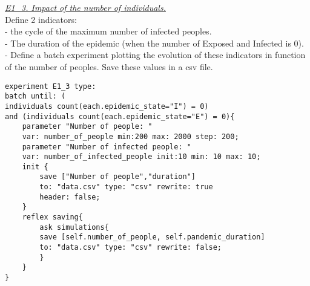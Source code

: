 \documentclass{article}
\begin{document}
\raggedright\underline{\textit{E1\_3. Impact of the number of individuals.}}
\\
Define 2 indicators:\\
- the cycle of the maximum number of infected peoples.\\
- The duration of the epidemic (when the number of Exposed and Infected is
0).\\
- Define a batch experiment plotting the evolution of these indicators in function
of the number of peoples. Save these values in a csv file.
\\[1\baselineskip]
\begin{tcolorbox}
\begin{lstlisting}
experiment E1_3 type: 
batch until: (
individuals count(each.epidemic_state="I") = 0) 
and (individuals count(each.epidemic_state="E") = 0){
	parameter "Number of people: " 
	var: number_of_people min:200 max: 2000 step: 200;
	parameter "Number of infected people: " 
	var: number_of_infected_people init:10 min: 10 max: 10;
	init {
		save ["Number of people","duration"] 
		to: "data.csv" type: "csv" rewrite: true 
		header: false;
	}
	reflex saving{
		ask simulations{
		save [self.number_of_people, self.pandemic_duration] 
		to: "data.csv" type: "csv" rewrite: false;
		}
	}
}
\end{lstlisting}
\end{tcolorbox}
\newpage
\end{document}
